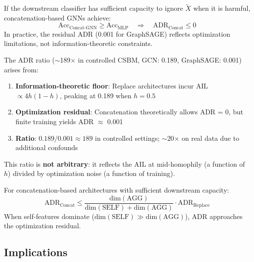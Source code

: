 \begin{corollary}
\label{cor:concat_zero_adr}
If the downstream classifier has sufficient capacity to ignore $\tilde{X}$ when it is harmful, concatenation-based GNNs achieve:
\begin{equation}
    \text{Acc}_{\text{Concat-GNN}} \geq \text{Acc}_{\text{MLP}} \quad \Rightarrow \quad \text{ADR}_{\text{Concat}} \leq 0
\end{equation}
In practice, the residual ADR (0.001 for GraphSAGE) reflects optimization limitations, not information-theoretic constraints.
\end{corollary}

\begin{remark}
\label{rem:200x_explanation}
The ADR ratio ($\sim$189$\times$ in controlled CSBM, GCN: 0.189, GraphSAGE: 0.001) arises from:
\begin{enumerate}
    \item \textbf{Information-theoretic floor}: Replace architectures incur AIL $\propto 4h(1-h)$, peaking at 0.189 when $h = 0.5$
    \item \textbf{Optimization residual}: Concatenation theoretically allows ADR = 0, but finite training yields ADR $\approx$ 0.001
    \item \textbf{Ratio}: $0.189 / 0.001 \approx 189$ in controlled settings; $\sim$20$\times$ on real data due to additional confounds
\end{enumerate}
This ratio is \textbf{not arbitrary}: it reflects the AIL at mid-homophily (a function of $h$) divided by optimization noise (a function of training).
\end{remark}

\begin{proposition}
\label{prop:concat_bound}
For concatenation-based architectures with sufficient downstream capacity:
\begin{equation}
    \text{ADR}_{\text{Concat}} \leq \frac{\text{dim}(\text{AGG})}{\text{dim}(\text{SELF}) + \text{dim}(\text{AGG})} \cdot \text{ADR}_{\text{Replace}}
\end{equation}
When self-features dominate ($\text{dim}(\text{SELF}) \gg \text{dim}(\text{AGG})$), ADR approaches the optimization residual.
\end{proposition}

\subsection{Implications}


